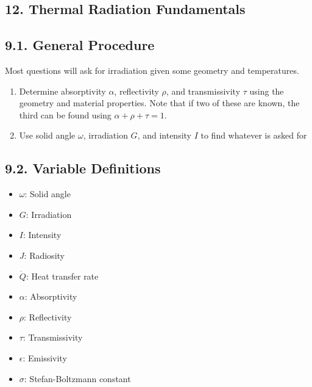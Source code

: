 \begin{multicols*}{2}
\section*{12. Thermal Radiation Fundamentals}
\subsection*{9.1. General Procedure}
Most questions will ask for irradiation given some geometry and temperatures.
\begin{enumerate}
    \item Determine absorptivity $\alpha$, reflectivity $\rho$, and transmissivity $\tau$ using the geometry and material properties. 
    Note that if two of these are known, the third can be found using $\alpha + \rho + \tau = 1$.
    \item Use solid angle $\omega$, irradiation $G$, and intensity $I$ to find whatever is asked for
\end{enumerate}
\subsection*{9.2. Variable Definitions}
\begin{itemize}
    \item $\omega$: Solid angle
    \item $G$: Irradiation
    \item $I$: Intensity
    \item $J$: Radiosity
    \item $\dot{Q}$: Heat transfer rate
    \item $\alpha$: Absorptivity
    \item $\rho$: Reflectivity
    \item $\tau$: Transmissivity
    \item $\epsilon$: Emissivity
    \item $\sigma$: Stefan-Boltzmann constant
\end{itemize}


\end{multicols*}
